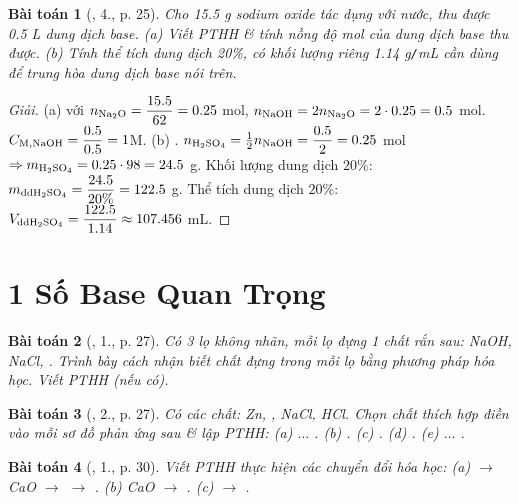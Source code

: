 \documentclass{article}
\newtheorem{baitoan}{Bài toán}
\begin{document}
\begin{baitoan}[\cite{SGK_Hoa_Hoc_9}, 4., p. 25]
	Cho {\rm15.5 g} sodium oxide {\rm{}} tác dụng với nước, thu được {\rm0.5 L} dung dịch base. (a) Viết {\rm PTHH} \& tính nồng độ mol của dung dịch base thu được. (b) Tính thể tích dung dịch {\rm{} 20\%}, có khối lượng riêng {\rm1.14 g{\tt/}mL} cần dùng để trung hòa dung dịch base nói trên.
\end{baitoan}

\begin{proof}[Giải]
	(a)  với $n_{\ce{Na2O}} = \dfrac{15.5}{62} = 0.25$ mol, $n_{\rm NaOH} = 2n_{\ce{Na2O}} = 2\cdot0.25 = 0.5$ mol. $C_{\rm M,NaOH} = \dfrac{0.5}{0.5} = 1$M. (b) . $n_{\ce{H2SO4}} = \frac{1}{2}n_{\rm NaOH} = \dfrac{0.5}{2} = 0.25$ mol $\Rightarrow m_{\ce{H2SO4}} = 0.25\cdot98 = 24.5$ g. Khối lượng dung dịch  $20\%$: $m_{\rm dd\ce{H2SO4}} = \dfrac{24.5}{20\%} = 122.5$ g. Thể tích dung dịch  $20\%$: $V_{\rm dd\ce{H2SO4}} = \dfrac{122.5}{1.14}\approx107.456$ mL.
\end{proof}


\section{1 Số Base Quan Trọng}

\begin{baitoan}[\cite{SGK_Hoa_Hoc_9}, 1., p. 27]
	Có 3 lọ không nhãn, mỗi lọ đựng 1 chất rắn sau: {\rm NaOH, NaCl, }. Trình bày cách nhận biết chất đựng trong mỗi lọ bằng phương pháp hóa học. Viết {\rm PTHH} (nếu có).
\end{baitoan}

\begin{baitoan}[\cite{SGK_Hoa_Hoc_9}, 2., p. 27]
	Có các chất: {\rm Zn, , NaCl, HCl}. Chọn chất thích hợp điền vào mỗi sơ đồ phản ứng sau \& lập PTHH: {\rm(a) $\ldots$ . (b) . (c) . (d) . (e) $\ldots$ }.
\end{baitoan}

\begin{baitoan}[\cite{SGK_Hoa_Hoc_9}, 1., p. 30]
	Viết {\rm PTHH} thực hiện các chuyển đổi hóa học: (a) {\rm{} $\to$ CaO $\to$  $\to$ }. (b) {\rm CaO $\to$ }. (c) {\rm{} $\to$ }.
\end{baitoan}
\end{document}
